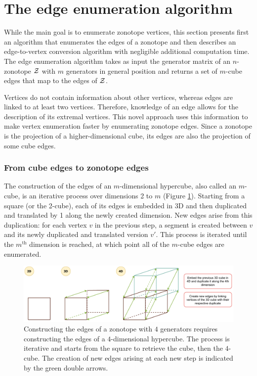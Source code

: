 \section{The edge enumeration algorithm}
\label{edge_enumeration_algorithm_section}

While the main goal is to enumerate zonotope vertices, this section presents first an algorithm that enumerates the edges of a zonotope and then describes an edge-to-vertex conversion algorithm with negligible additional computation time. The edge enumeration algorithm takes as input the generator matrix of an $n$-zonotope $\mathcal{Z}$ with $m$ generators in general position and returns a set of $m$-cube edges that map to the edges of $\mathcal{Z}$.

Vertices do not contain information about other vertices, whereas edges are linked to at least two vertices. Therefore, knowledge of an edge allows for the description of its extremal vertices. This novel approach uses this information to make vertex enumeration faster by enumerating zonotope edges. Since a zonotope is the projection of a higher-dimensional cube, its edges are also the projection of some cube edges.

\subsubsection*{From cube edges to zonotope edges}
The construction of the edges of an $m$-dimensional hypercube, also called an $m$-cube, is an iterative process over dimensions 2 to $m$ (Figure \ref{fig:cube_edge_construction}). Starting from a square (or the 2-cube), each of its edges is embedded in 3D and then duplicated and translated by 1 along the newly created dimension.  New edges arise from this duplication: for each vertex $v$ in the previous step, a segment is created between $v$ and its newly duplicated and translated version $v'$. This process is iterated until the $m^{\text{th}}$ dimension is reached, at which point all of the $m$-cube edges are enumerated.

\begin{figure}[!htb]
  \captionsetup{justification=centering}
  \centering
  \includegraphics[trim={0 0 0 0},clip, width=1.0\linewidth]{img/chapter_2/zonotope_construction_from_cube_edge_duplication.pdf}
  \caption{Constructing the edges of a zonotope with $4$ generators requires constructing the edges of a $4$-dimensional hypercube. The process is iterative and starts from the square to retrieve the cube, then the $4$-cube. The creation of new edges arising at each new step is indicated by the green double arrows.}
  \label{fig:cube_edge_construction}
\end{figure}

